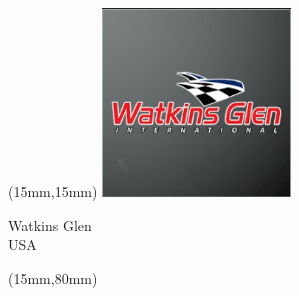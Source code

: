 \begin{textblock*}{50mm}(15mm,15mm)%
\includegraphics[width=50mm]{LG/2015-05-20_00097.png}
\par Watkins Glen\\ USA
\end{textblock*}
\begin{textblock*}{185mm}(15mm,80mm)%
\end{textblock*}
